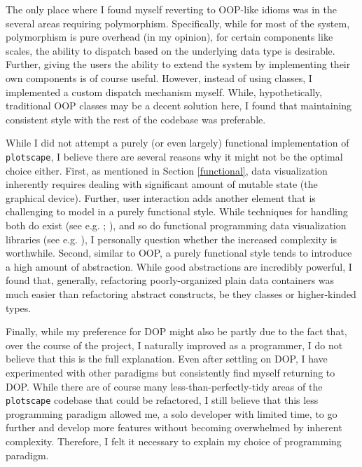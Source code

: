 \documentclass[
  openany]{book}
\theoremstyle{definition}
\theoremstyle{definition}
\theoremstyle{definition}
\theoremstyle{definition}
\theoremstyle{remark}
\begin{document}
The only place where I found myself reverting to OOP-like idioms was in the several areas requiring polymorphism. Specifically, while for most of the system, polymorphism is pure overhead (in my opinion), for certain components like scales, the ability to dispatch based on the underlying data type is desirable. Further, giving the users the ability to extend the system by implementing their own components is of course useful. However, instead of using classes, I implemented a custom dispatch mechanism myself. While, hypothetically, traditional OOP classes may be a decent solution here, I found that maintaining consistent style with the rest of the codebase was preferable.

While I did not attempt a purely (or even largely) functional implementation of \texttt{plotscape}, I believe there are several reasons why it might not be the optimal choice either. First, as mentioned in Section \ref{functional}, data visualization inherently requires dealing with significant amount of mutable state (the graphical device). Further, user interaction adds another element that is challenging to model in a purely functional style. While techniques for handling both do exist (see e.g. ; ), and so do functional programming data visualization libraries (see e.g. ), I personally question whether the increased complexity is worthwhile. Second, similar to OOP, a purely functional style tends to introduce a high amount of abstraction. While good abstractions are incredibly powerful, I found that, generally, refactoring poorly-organized plain data containers was much easier than refactoring abstract constructs, be they classes or higher-kinded types.

Finally, while my preference for DOP might also be partly due to the fact that, over the course of the project, I naturally improved as a programmer, I do not believe that this is the full explanation. Even after settling on DOP, I have experimented with other paradigms but consistently find myself returning to DOP. While there are of course many less-than-perfectly-tidy areas of the \texttt{plotscape} codebase that could be refactored, I still believe that this less programming paradigm allowed me, a solo developer with limited time, to go further and develop more features without becoming overwhelmed by inherent complexity. Therefore, I felt it necessary to explain my choice of programming paradigm.
\end{document}
